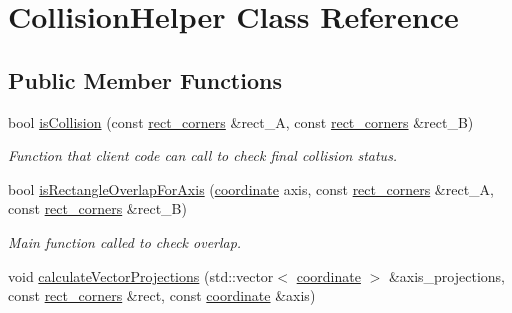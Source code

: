 \hypertarget{class_collision_helper}{\section{Collision\+Helper Class Reference}
\label{class_collision_helper}
}
\subsection*{Public Member Functions}
\begin{DoxyCompactItemize}
\item 
\hypertarget{class_collision_helper_a7d01caf852dbcaf55f29423b23ee41b0}{bool \hyperlink{class_collision_helper_a7d01caf852dbcaf55f29423b23ee41b0}{is\+Collision} (const \hyperlink{structrect__corners}{rect\+\_\+corners} \&rect\+\_\+\+A, const \hyperlink{structrect__corners}{rect\+\_\+corners} \&rect\+\_\+\+B)}\label{class_collision_helper_a7d01caf852dbcaf55f29423b23ee41b0}

\begin{DoxyCompactList}\small\item\em Function that client code can call to check final collision status. \end{DoxyCompactList}\item 
\hypertarget{class_collision_helper_a98eec1721067ba0a05a2ab1fa6e4225b}{bool \hyperlink{class_collision_helper_a98eec1721067ba0a05a2ab1fa6e4225b}{is\+Rectangle\+Overlap\+For\+Axis} (\hyperlink{structcoordinate}{coordinate} axis, const \hyperlink{structrect__corners}{rect\+\_\+corners} \&rect\+\_\+\+A, const \hyperlink{structrect__corners}{rect\+\_\+corners} \&rect\+\_\+\+B)}\label{class_collision_helper_a98eec1721067ba0a05a2ab1fa6e4225b}

\begin{DoxyCompactList}\small\item\em Main function called to check overlap. \end{DoxyCompactList}\item 
\hypertarget{class_collision_helper_a0b7a4d3a6d63aa67264b99f4257bd94d}{void \hyperlink{class_collision_helper_a0b7a4d3a6d63aa67264b99f4257bd94d}{calculate\+Vector\+Projections} (std\+::vector$<$ \hyperlink{structcoordinate}{coordinate} $>$ \&axis\+\_\+projections, const \hyperlink{structrect__corners}{rect\+\_\+corners} \&rect, const \hyperlink{structcoordinate}{coordinate} \&axis)}\label{class_collision_helper_a0b7a4d3a6d63aa67264b99f4257bd94d}


\end{DoxyCompactItemize}
